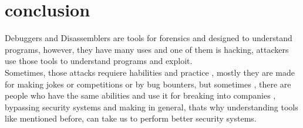 \documentclass[10pt,a4paper]{article} %
\begin{document}
    \section{conclusion}
        Debuggers and Disassemblers  are tools for forensics and designed to
        understand programs, however, they have many uses and one of them is
        hacking, attackers use those tools to understand programs and exploit.
        \\ Sometimes, those attacks requiere habilities and practice , mostly
        they are made for making jokes or competitions or by bug bounters,
        but sometimes , there are people who have the same abilities and use it
        for breaking into companies , bypassing security systems and making
        in general, thats why understanding tools like mentioned before, can
        take us to perform better security systems.


























    \nocite{*}
    
    
\end{document}
